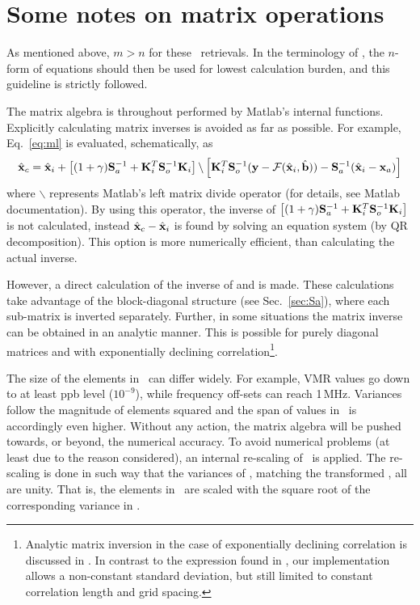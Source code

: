 \section{Some notes on matrix operations}
\label{sec:matrixops}
%
As mentioned above, $m>n$ for these \smr\ retrievals. In the terminology of 
\citet{rodgers:00}, the $n$-form of equations should then be used for lowest
calculation burden, and this guideline is strictly followed.

The matrix algebra is throughout performed by Matlab's internal functions. Explicitly calculating matrix inverses is avoided as far as possible. For
example, Eq.~\ref{eq:ml} is evaluated, schematically, as
\begin{displaymath}
  \hat{\mathbf{x}}_c = \hat{\mathbf{x}}_i + 
  \left[ (1+\gamma)\mathbf{S}_{a}^{-1} + 
          \mathbf{K}_{i}^T\mathbf{S}_{o}^{-1}\mathbf{K}_{i} \right] \backslash
  \left[ \mathbf{K}_{i}^T\mathbf{S}_{o}^{-1}(\mathbf{y}-\mathcal{F}(\hat{\mathbf{x}}_i,\hat{\mathbf{b}})) -
         \mathbf{S}_{a}^{-1}(\hat{\mathbf{x}}_i-\mathbf{x}_{a})\right]  
\end{displaymath}
where $\backslash$ represents Matlab's left matrix divide operator (for
details, see Matlab documentation). By using this operator, the inverse
of $\left[ (1+\gamma)\mathbf{S}_{a}^{-1} +
  \mathbf{K}_{i}^T\mathbf{S}_{o}^{-1}\mathbf{K}_{i} \right]$ is not calculated, instead
$\hat{\mathbf{x}}_c - \hat{\mathbf{x}}_i$ is found by solving an equation system (by QR
decomposition). This option is more numerically efficient, than calculating the
actual inverse.

However, a direct calculation of the inverse of  and  is
made. These calculations take advantage of the block-diagonal structure (see
Sec.~\ref{sec:Sa}), where each sub-matrix is inverted separately. Further, in
some situations the matrix inverse can be obtained in an analytic manner. This
is possible for purely diagonal matrices and with exponentially declining
correlation\footnote{Analytic matrix inversion in the case of exponentially
  declining correlation is discussed in \citet[][Sec.~10.3.2.2]{rodgers:00}. In
  contrast to the expression found in \citet{rodgers:00}, our implementation
  allows a non-constant standard deviation, but still limited to constant
  correlation length and grid spacing.}.

The size of the elements in \SttVct\ can differ widely. For example, VMR values
go down to at least ppb level ($10^{-9}$), while frequency off-sets can reach
1\,MHz. Variances follow the magnitude of elements squared and the span of
values in \ is accordingly even higher. Without any action, the
matrix algebra will be pushed towards, or beyond, the numerical accuracy. To
avoid numerical problems (at least due to the reason considered), an internal
re-scaling of \SttVct\ is applied. The re-scaling is done in such way that the
variances of , matching the transformed \SttVct, all are unity. That
is, the elements in \SttVct\ are scaled with the square root of the
corresponding variance in .


